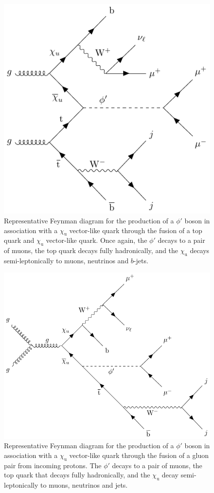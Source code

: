 \begin{figure}
    \centering
    \includegraphics[width=0.75\linewidth]{Images/signal_qqfusion.pdf}
    \caption{Representative Feynman diagram for the production of a $\phi'$ boson in association with a $\chi_\mathrm{u}$ vector-like quark through the fusion of a top quark and $\chi_\mathrm{u}$ vector-like quark. Once again, the $\phi'$ decays to a pair of muons, the top quark decays fully hadronically, and the $\chi_\mathrm{u}$ decays semi-leptonically to muons, neutrinos and $b$-jets.\label{fig:qqfusion}}
\end{figure}

\begin{figure}
    \centering
    \includegraphics[width=0.85\linewidth]{Images/signal_ggfusion.pdf}
    \caption{Representative Feynman diagram for the production of a $\phi'$ boson in association with a $\chi_\mathrm{u}$ vector-like quark through the fusion of a gluon pair from incoming protons. The $\phi'$ decays to a pair of muons, the top quark that decays fully hadronically, and the $\chi_\mathrm{u}$ decay semi-leptonically to muons, neutrinos and jets.\label{fig:ggfusion}}
\end{figure}

